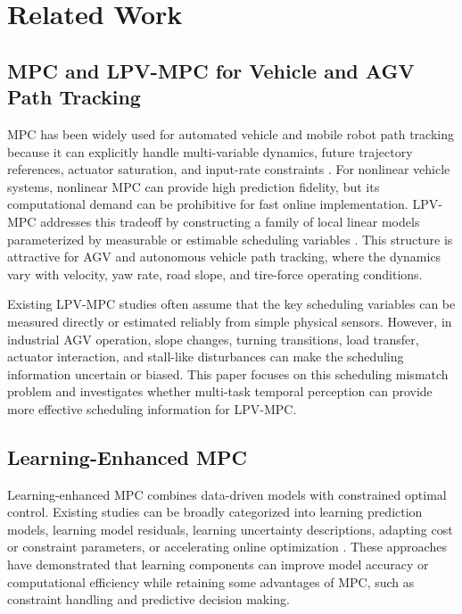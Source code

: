\documentclass{ieeeaccess}
\begin{document}
\section{Related Work}

\label{sec:related_work}

\subsection{MPC and LPV-MPC for Vehicle and AGV Path Tracking}

MPC has been widely used for automated vehicle and mobile robot path tracking because it can explicitly handle multi-variable dynamics, future trajectory references, actuator saturation, and input-rate constraints \cite{Stano2023MPCPathTrackingReview}. For nonlinear vehicle systems, nonlinear MPC can provide high prediction fidelity, but its computational demand can be prohibitive for fast online implementation. LPV-MPC addresses this tradeoff by constructing a family of local linear models parameterized by measurable or estimable scheduling variables \cite{Alcala2020LPVMPC}. This structure is attractive for AGV and autonomous vehicle path tracking, where the dynamics vary with velocity, yaw rate, road slope, and tire-force operating conditions.

Existing LPV-MPC studies often assume that the key scheduling variables can be measured directly or estimated reliably from simple physical sensors. However, in industrial AGV operation, slope changes, turning transitions, load transfer, actuator interaction, and stall-like disturbances can make the scheduling information uncertain or biased. This paper focuses on this scheduling mismatch problem and investigates whether multi-task temporal perception can provide more effective scheduling information for LPV-MPC.

\subsection{Learning-Enhanced MPC}

Learning-enhanced MPC combines data-driven models with constrained optimal control. Existing studies can be broadly categorized into learning prediction models, learning model residuals, learning uncertainty descriptions, adapting cost or constraint parameters, or accelerating online optimization \cite{Hewing2020LearningBasedMPC}. These approaches have demonstrated that learning components can improve model accuracy or computational efficiency while retaining some advantages of MPC, such as constraint handling and predictive decision making.
\end{document}
